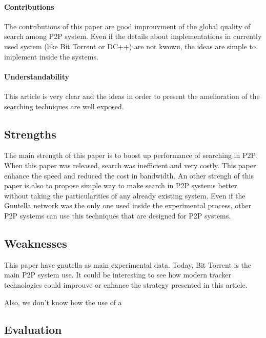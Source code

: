 \paragraph{Contributions}

The contributions of this paper are good improuvment of the global quality
of search among P2P system. Even if the details about implementations in
currently used system (like Bit Torrent or DC++) are not kwown, the ideas
are simple to implement inside the systems.

\paragraph{Understandability}

This article is very clear and the ideas in order to present the
amelioration of the searching techniques are well exposed.

\subsection{Strengths}


The main strength of this paper is to boost up performance
of searching in P2P. When this paper was released, search
was inefficient and very costly. This paper enhance the speed
and reduced the cost in bandwidth. An other strengh of this paper
is also to propose simple way to make search in P2P systems better
without taking the particularities of any already existing system.
Even if the Gnutella network was the only one used inside the experimental
process, other P2P systems can use this techniques that are designed for
P2P systems.

\subsection{Weaknesses}


This paper have gnutella as main experimental data. Today, Bit Torrent is the main
P2P system use. It could be interesting to see how modern tracker technologies could improuve
or enhance the strategy presented in this article.

Also, we don't know how the use of a 
\subsection{Evaluation}

